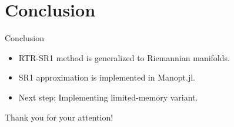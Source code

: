 \documentclass{beamer}
\begin{document}
\section{Conclusion}

\begin{frame}{Conclusion}
    \begin{itemize}
        \item RTR-SR1 method is generalized to Riemannian manifolds.
        \item SR1 approximation is implemented in Manopt.jl.
        \item Next step: Implementing limited-memory variant.
    \end{itemize}
    \begin{center}
        Thank you for your attention! 
    \end{center}
\end{frame}
\end{document}
